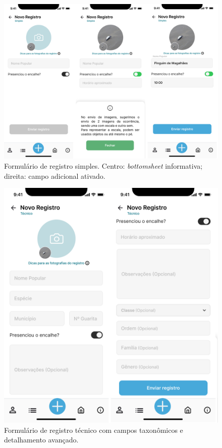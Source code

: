 \begin{figure}[H]
    \centering
    \includegraphics[height=0.55\textheight, width=\textwidth]{imagens/registro-simples-figma.png}
    \caption{Formulário de registro simples. Centro: \textit{bottomsheet} informativa; direita: campo 
    adicional ativado.}
    \label{fig:prototipo-registro-simples}
\end{figure}

\begin{figure}[H]
    \centering
    \includegraphics[height=0.6\textheight]{imagens/registro-tecnico-figma.png}
    \caption{Formulário de registro técnico com campos taxonômicos e detalhamento avançado.}
    \label{fig:prototipo-registro-tecnico}
\end{figure}


